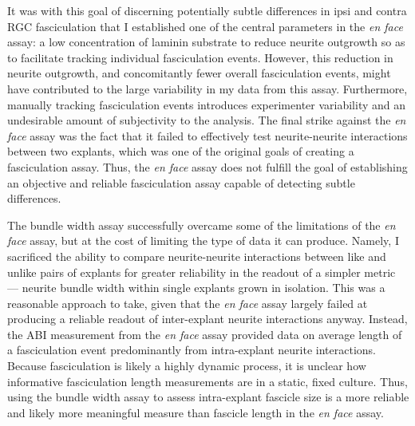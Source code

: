 It was with this goal of discerning potentially subtle differences in ipsi and contra RGC fasciculation that I established one of the central parameters in the \emph{en face} assay: a low concentration of laminin substrate to reduce neurite outgrowth so as to facilitate tracking individual fasciculation events.
However, this reduction in neurite outgrowth, and concomitantly fewer overall fasciculation events, might have contributed to the large variability in my data from this assay.
Furthermore, manually tracking fasciculation events introduces experimenter variability and an undesirable amount of subjectivity to the analysis.
The final strike against the \emph{en face} assay was the fact that it failed to effectively test neurite-neurite interactions between two explants, which was one of the original goals of creating a fasciculation assay.
Thus, the \emph{en face} assay does not fulfill the goal of establishing an objective and reliable fasciculation assay capable of detecting subtle differences.

The bundle width assay successfully overcame some of the limitations of the \emph{en face} assay, but at the cost of limiting the type of data it can produce.
Namely, I sacrificed the ability to compare neurite-neurite interactions between like and unlike pairs of explants for greater reliability in the readout of a simpler metric --- neurite bundle width within single explants grown in isolation.
This was a reasonable approach to take, given that the \emph{en face} assay largely failed at producing a reliable readout of inter-explant neurite interactions anyway.
Instead, the ABI measurement from the \emph{en face} assay provided data on average length of a fasciculation event predominantly from intra-explant neurite interactions.
Because fasciculation is likely a highly dynamic process, it is unclear how informative fasciculation length measurements are in a static, fixed culture.
Thus, using the bundle width assay to assess intra-explant fascicle size is a more reliable and likely more meaningful measure than fascicle length in the \emph{en face} assay.

